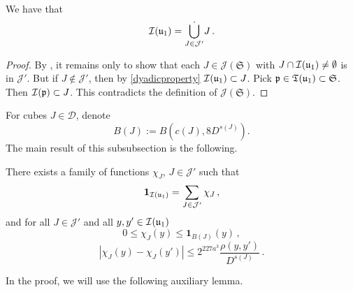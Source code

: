     \begin{lemma}
        \label{dyadic-partition-1}
        \leanok
        We have that
        $$
            {\mathcal{I}}({\mathfrak u}_1) = \dot{\bigcup_{J \in \mathcal{J}'}} J\,.
        $$
    \end{lemma}

    \begin{proof}
        \leanok
        By , it remains only to show that each $J \in \mathcal{J}(\mathfrak{S})$ with $J \cap {\mathcal{I}}({\mathfrak u}_1) \ne \emptyset$ is in $\mathcal{J}'$. But if $J \notin \mathcal{J}'$, then by \eqref{dyadicproperty} ${\mathcal{I}}({\mathfrak u}_1) \subset J$. Pick ${\mathfrak p} \in {\mathfrak T}({\mathfrak u}_1) \subset \mathfrak{S}$. Then ${\mathcal{I}}({\mathfrak p}) \subset J$. This contradicts the definition of $\mathcal{J}(\mathfrak{S})$.
    \end{proof}

    For cubes $J \in \mathcal{D}$, denote
    \begin{equation}
        \label{def-BJ}
        B(J) := B(c(J), 8D^{s(J)}).
    \end{equation}
    The main result of this subsubsection is the following.

    \begin{lemma}
        \label{Lipschitz-partition-unity}
        \leanok
        There exists a family of functions $\chi_J$, $J \in \mathcal{J}'$ such that \begin{equation}
            \label{eq-pao-1}
            \mathbf{1}_{{\mathcal{I}}({\mathfrak u}_1)} = \sum_{J \in \mathcal{J}'} \chi_J\,,
        \end{equation}
        and for all $J \in \mathcal{J}'$ and all $y,y' \in {\mathcal{I}}({\mathfrak u}_1)$
      \begin{equation}
            \label{eq-pao-2}
            0 \leq \chi_J(y) \leq \mathbf{1}_{B(J)}(y)\,,
        \end{equation}
      \begin{equation}
            \label{eq-pao-3}
            |\chi_J(y) - \chi_J(y')| \le 2^{227a^3} \frac{\rho(y,y')}{D^{s(J)}}\,.
        \end{equation}
    \end{lemma}

    In the proof, we will use the following auxiliary lemma.

